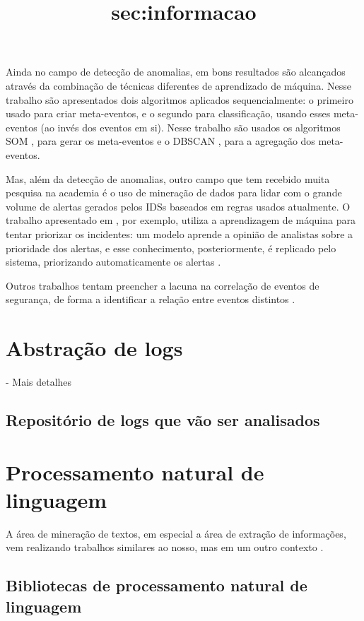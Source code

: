 \documentclass[
	12pt,				%
	openright,			%
	twoside,			%
	a4paper,			%
	english,			%
	french,				%
	spanish,			%
	brazil,				%
	]{abntex2}
\begin{document}
Ainda no campo de detecção de anomalias, em \cite{li2013automatic} bons resultados são alcançados através da combinação de técnicas diferentes de aprendizado de máquina. Nesse trabalho são apresentados dois algoritmos aplicados sequencialmente: o primeiro usado para criar meta-eventos, e o segundo para classificação, usando esses meta-eventos (ao invés dos eventos em si). Nesse trabalho são usados os algoritmos SOM \cite{kohonen1989self}, para gerar os meta-eventos e o DBSCAN \cite{ester1996density}, para a agregação dos meta-eventos.

Mas, além da detecção de anomalias, outro campo que tem recebido muita pesquisa na academia é o uso de mineração de dados para lidar com o grande volume de alertas gerados pelos IDSs baseados em regras usados atualmente. O trabalho apresentado em \cite{zomlot2013aiding}, por exemplo, utiliza a aprendizagem de máquina para tentar priorizar os incidentes: um modelo aprende a opinião de analistas sobre a prioridade dos alertas, e esse conhecimento, posteriormente, é replicado pelo sistema, priorizando automaticamente os alertas .

Outros trabalhos tentam preencher a lacuna na correlação de eventos de segurança, de forma a identificar a relação entre eventos distintos \cite{smith2008using, stroeh2013approach}.

\section{Abstração de logs}\title{sec:informacao}
- Mais detalhes

\subsection{Repositório de logs que vão ser analisados}

\section{Processamento natural de linguagem}

A área de mineração de textos, em especial a área de extração de informações, vem realizando trabalhos similares ao nosso, mas em um outro contexto \cite{duque2012processo, matos2010environment}.

\subsection{Bibliotecas de processamento natural de linguagem}
\end{document}

